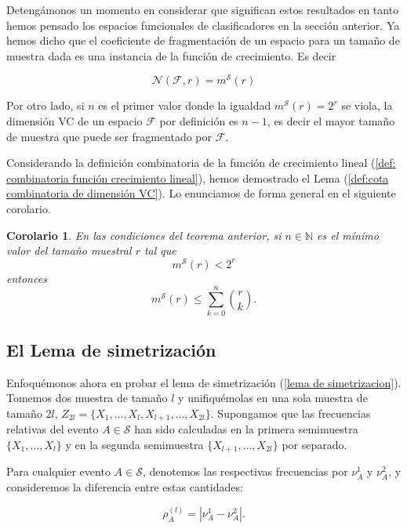 \documentclass{report}
\newtheorem{cor}{Corolario}[thm]
\begin{document}
Detengámonos un momento en considerar que significan estos resultados en tanto hemos pensado los espacios funcionales
de clasificadores en la sección anterior. Ya hemos dicho que el coeficiente de fragmentación de un espacio para un tamaño
de muestra dada es una instancia de la función de crecimiento. Es decir

\[
\mathcal{N}(\mathcal{F}, r) = m^{\mathcal{S}}(r)
\]

Por otro lado, si $n$ es el primer valor donde la igualdad $m^{\mathcal{S}}(r)=2^r$ se viola, la dimensión VC de un espacio $\mathcal{F}$ 
por definición es $n-1$, es decir el mayor tamaño de muestra que puede ser fragmentado por $\mathcal{F}$.\newline

Considerando la definición combinatoria de la función de crecimiento lineal (\ref{def: combinatoria función crecimiento lineal}),
hemos demostrado el Lema (\ref{def:cota combinatoria de dimensión VC}). Lo enunciamos de forma general en el siguiente corolario.

\begin{cor}
    En las condiciones del teorema anterior, si $n\in\mathbb{N}$ es el mínimo valor del tamaño muestral $r$ tal que    
    \[
        m^{\mathcal{S}}(r) < 2^r
    \]
    entonces
    \[
        m^{\mathcal{S}}(r) \leq \sum\limits_{k=0}^{n} \binom{r}{k}. 
    \]
\end{cor}

\bigskip

\subsection{El Lema de simetrización}

Enfoquémonos ahora en probar el lema de simetrización (\ref{lema de simetrizacion}). Tomemos dos muestra de tamaño $l$ y
unifiquémolas en una sola muestra de tamaño \( 2l \),
\( Z_{2l} = \{ X_1, \dots, X_l, X_{l+1}, \dots, X_{2l} \} \). Supongamos que las frecuencias relativas del evento \( A \in \mathcal{S} \) 
han sido calculadas en la primera semimuestra \( \{ X_1, \dots, X_l \} \) y en la segunda semimuestra \( \{ X_{l+1}, \dots, X_{2l} \} \)
por separado.\newline

Para cualquier evento $A\in\mathcal{S}$, denotemos las respectivas frecuencias por \( \nu_A^{1}\) y \( \nu_A^{2} \), 
y consideremos la diferencia entre estas cantidades:

\[
\rho^{(l)}_A = |\nu_A^{1} - \nu_A^{2}|.
\]
\end{document}

